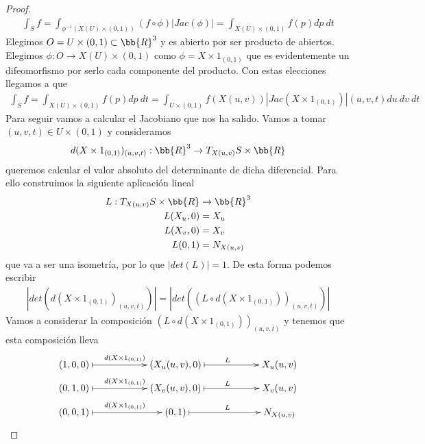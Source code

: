 \begin{prop}
\begin{proof}
\begin{gather*}
            \int_S f = \int_{\phi^{-1}(X(U)\times (0,1))} (f\circ \phi) |Jac(\phi)| = \int_{X(U)\times(0,1)} f(p)dp\ dt
        \end{gather*}
        Elegimos $O = U\times (0,1)\subset \bb{R}^3$ y es abierto por ser producto de abiertos. Elegimos $\phi: O \to X(U)\times (0,1)$ como $\phi = X \times 1_{(0,1)}$ que es evidentemente un difeomorfismo por serlo cada componente del producto. Con estas elecciones llegamos a que  
        \begin{gather*}
            \int_S f = \int_{X(U)\times (0,1)} f(p) dp\ dt  = \int_{U\times(0,1)} f(X(u,v)) |Jac(X\times 1_{(0,1)})|(u,v,t) du\ dv\ dt
        \end{gather*}
        Para seguir vamos a calcular el Jacobiano que nos ha salido. Vamos a tomar $(u,v,t)\in U\times (0,1)$ y consideramos
        \begin{gather*}
            d(X\times 1_{(0,1)})_{(u,v,t)} : \bb{R}^3 \to T_{X(u,v)}S\times \bb{R}
        \end{gather*}
        queremos calcular el valor absoluto del determinante de dicha diferencial. Para ello construimos la siguiente aplicación lineal 
        \begin{align*}
            L : T_{X(u,v)}S \times \bb{R} &\to \bb{R}^3\\
            L(X_u, 0) &= X_u\\
            L(X_v, 0) &= X_v\\
            L(0, 1) &= N_{X(u,v)}
        \end{align*}
        que va a ser una isometría, por lo que $|det(L)| = 1$. De esta forma podemos escribir      
        \begin{gather*}
            |det(d(X\times 1_{(0,1)})_{(u,v,t)})| = |det( (L \circ d(X\times 1_{(0,1)}))_{(u,v,t)})|
        \end{gather*}
        Vamos a considerar la composición $(L \circ d(X\times 1_{(0,1)}))_{(u,v,t)}$ y tenemos que esta composición lleva
        \begin{gather*}
            \xymatrix@C=2cm@R=3mm{
                (1,0,0) \ar@{|->}[r]^{d(X\times 1_{(0,1)})} & (X_u(u,v), 0) \ar@{|->}[r]^{L} & X_u(u,v)\\
                (0,1,0) \ar@{|->}[r]^{d(X\times 1_{(0,1)})} & (X_v(u,v), 0) \ar@{|->}[r]^{L} & X_v(u,v)\\
                (0,0,1) \ar@{|->}[r]^{d(X\times 1_{(0,1)})} & (0,1) \ar@{|->}[r]^{L} &  N_{X(u,v)}
            }
        \end{gather*}

\end{proof}
\end{prop}

